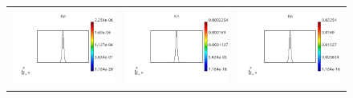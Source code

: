 \documentclass[review]{elsarticle}
\begin{document}
\begin{figure}[tbh]
  \begin{center}
    \begin{tabular}{ccc}
      \includegraphics[width=\psize\textwidth]{figs/Kn_p71D1e12.png} &
      \includegraphics[width=\psize\textwidth]{figs/Kn_p71D1e10.png} &
      \includegraphics[width=\psize\textwidth]{figs/Kn_p71D1e8.png} \\

\end{tabular}
\end{center}
\end{figure}
\end{document}
